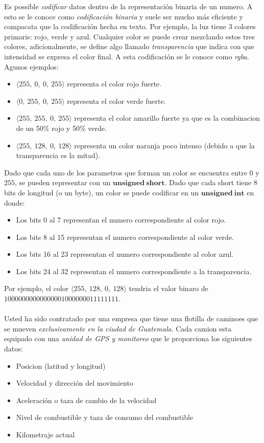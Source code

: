 \documentclass{article}
\begin{document}
Es possible \emph{codificar} datos dentro de la representaci\'on binaria de un numero. A esto se le conoce
como \emph{codificaci\'on binaria} y suele ser mucho m\'as eficiente y compacata que la codificaci\'on hecha
en texto. Por ejemplo, la luz tiene 3 colores primaris: rojo, verde y azul. Cualquier color se puede crear
mezclando estos tres colores, adicionalmente, se define algo llamado \emph{transparencia} que indica con que
intensidad se expresa el color final. A esta codificaci\'on se le conoce como \emph{rgba}. Agunos ejemplos:
\begin{itemize}
    \item{$\langle 255,\ 0,\ 0,\ 255\rangle$ representa el color rojo fuerte.}
    \item{$\langle 0,\ 255,\ 0,\ 255\rangle$ representa el color verde fuerte.}
    \item{$\langle 255,\ 255,\ 0,\ 255\rangle$ representa el color amarillo fuerte ya que es la combinacion de un 50\% rojo y 50\% verde.}
    \item{$\langle 255,\ 128,\ 0,\ 128\rangle$ representa un color naranja poco intenso (debido a que la transparencia es la mitad).}
\end{itemize}
Dado que cada uno de los parametros que forman un color se encuentra entre $0$ y $255$, se pueden representar
con un $\mathbf{unsigned\ short}$. Dado que cada short tiene 8 bits de longitud (o un byte), un color se puede
codificar en un $\mathbf{unsigned\ int}$ en donde:
\begin{itemize}
    \item{Los bits 0 al 7 representan el numero correspondiente al color rojo.}
    \item{Los bits 8 al 15 representan el numero correspondiente al color verde.}
    \item{Los bits 16 al 23 representan el numero correspondiente al color azul. }
    \item{Los bits 24 al 32 representan el numero correspondiente a la transparencia. }
\end{itemize}
Por ejemplo, el color $\langle 255,\ 128,\ 0,\ 128\rangle$ tendria el valor binaro de $10000000000000001000000011111111$.
\\\\Usted ha sido contratado por una empresa que tiene una flotilla de caminoes que se mueven \emph{exclusivamente en
la ciudad de Guatemala}.
Cada camion esta equipado con una \emph{unidad de GPS y monitoreo} que le proporciona los siguientes datos:
\begin{itemize}
    \item{Posicion (latitud y longitud)}
    \item{Velocidad y direcci\'on del movimiento}
    \item{Aceleraci\'on o taza de cambio de la velocidad}
    \item{Nivel de combustible y taza de consumo del combustible}
    \item{Kilometraje actual}
\end{itemize}
\end{document}
